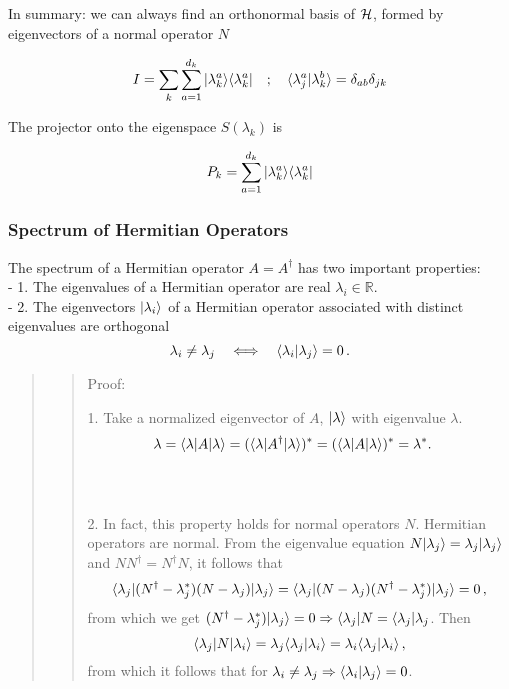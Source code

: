 \documentclass[11pt]{article}
\begin{document}
In summary: we can always find an orthonormal basis of \({\cal H}\), formed
by eigenvectors of a normal operator \(N\)

\[
I = \sum_k \sum_{a=1}^{d_k} |\lambda^a_k\rangle\langle \lambda^a_k| \quad ; \quad \langle \lambda^a_j|\lambda^b_k\rangle = \delta_{ab}\delta_{jk}
\]

The projector onto the eigenspace \(S(\lambda_k)\) is

\[
P_k = \sum_{a=1}^{d_k} | \lambda^a_k\rangle \langle \lambda^a_k|
\]

    \subsubsection{Spectrum of Hermitian
Operators}\label{spectrum-of-hermitian-operators}

The spectrum of a Hermitian operator \(A = A^\dagger\) has two important
properties: \\
- 1. The eigenvalues of a Hermitian operator are real
\(\lambda_i \in {\mathbb R}\). \\
- 2. The eigenvectors \(|\lambda_i\rangle\) of a Hermitian operator
associated with distinct eigenvalues are orthogonal \[
\lambda_i \neq \lambda_j ~~~\Longleftrightarrow~~~ \langle \lambda_i|\lambda_j\rangle = 0\, .
\]

\begin{quote}
\begin{quote}
Proof:

1. Take a normalized eigenvector of \(A\), \(|\lambda\rangle\) with
eigenvalue \(\lambda\). \[
\lambda = \langle \lambda|A|\lambda\rangle = (\langle \lambda|A^\dagger|\lambda\rangle)^* = (\langle \lambda|A|\lambda\rangle)^* = \lambda^* .~~~
\]\\
\strut \\
2. In fact, this property holds for normal operators \(N\). Hermitian
operators are normal. From the eigenvalue equation
\(N|\lambda_j\rangle = \lambda_j |\lambda_j\rangle\) and
\(NN^\dagger = N^\dagger N\), it follows that \[
\langle \lambda_j|(N^\dagger - \lambda_j^*)(N - \lambda_j) |\lambda_j\rangle = \langle \lambda_j|(N - \lambda_j)(N^\dagger - \lambda_j^*) |\lambda_j\rangle = 0\,,
\] from which we get
\((N^\dagger - \lambda_j^*) |\lambda_j\rangle = 0 \Rightarrow \langle \lambda_j| N = \langle \lambda_j| \lambda_j\).
Then \[
\langle \lambda_j|N|\lambda_i\rangle = \lambda_j \langle \lambda_j|\lambda_i\rangle = \lambda_i \langle \lambda_j|\lambda_i\rangle \, ,
\] from which it follows that for
\(\lambda_i \neq \lambda_j \Rightarrow \langle \lambda_i|\lambda_j\rangle = 0\).
\end{quote}
\end{quote}
\end{document}
